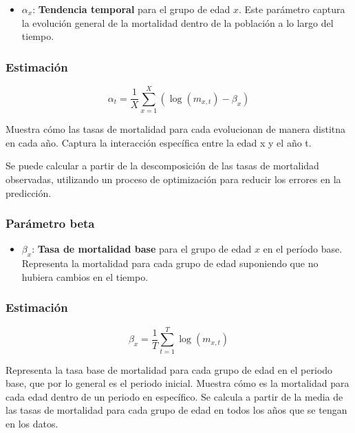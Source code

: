 \documentclass[
]{article}
\providecommand{\tightlist}{%
  \setlength{\itemsep}{0pt}\setlength{\parskip}{0pt}}
\begin{document}
\begin{itemize}
\tightlist
\item
  \(\alpha_x\): \textbf{Tendencia temporal} para el grupo de edad \(x\).
  Este parámetro captura la evolución general de la mortalidad dentro de
  la población a lo largo del tiempo.
\end{itemize}

\hypertarget{estimaciuxf3n}{%
\subsubsection{Estimación}\label{estimaciuxf3n}}

\[
\alpha_t = \frac{1}{X} \sum_{x=1}^{X} \left(\log(m_{x,t}) - \beta_x \right)
\]

Muestra cómo las tasas de mortalidad para cada evolucionan de manera
distitna en cada año. Captura la interacción específica entre la edad x
y el año t.

Se puede calcular a partir de la descomposición de las tasas de
mortalidad observadas, utilizando un proceso de optimización para
reducir los errores en la predicción.

\hypertarget{paruxe1metro-beta}{%
\subsubsection{Parámetro beta}\label{paruxe1metro-beta}}

\begin{itemize}
\tightlist
\item
  \(\beta_x\): \textbf{Tasa de mortalidad base} para el grupo de edad
  \(x\) en el período base. Representa la mortalidad para cada grupo de
  edad suponiendo que no hubiera cambios en el tiempo.
\end{itemize}

\hypertarget{estimaciuxf3n-1}{%
\subsubsection{Estimación}\label{estimaciuxf3n-1}}

\[
\beta_x = \frac{1}{T} \sum_{t=1}^{T} \log(m_{x,t})
\]

Representa la tasa base de mortalidad para cada grupo de edad en el
periodo base, que por lo general es el periodo inicial. Muestra cómo es
la mortalidad para cada edad dentro de un periodo en específico. Se
calcula a partir de la media de las tasas de mortalidad para cada grupo
de edad en todos los años que se tengan en los datos.
\end{document}
